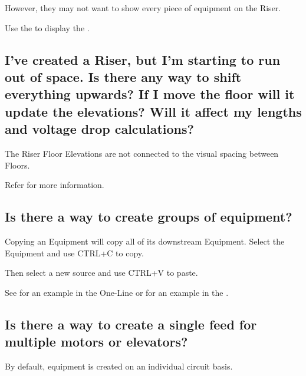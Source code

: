 \documentclass[letterpaper,10pt,english]{sphinxmanual}
\begin{document}
However, they may not want to show every piece of equipment on the Riser.

Use the {\hyperref[\detokenize{docs/userguide/buildingelectricalmodel/riser/index-riser:riser-toolbox}]{}} to display the {\hyperref[\detokenize{docs/userguide/buildingelectricalmodel/riser/index-riser:hidden-elements}]{}}.


\subsection{I’ve created a Riser, but I’m starting to run out of space.  Is there any way to shift everything upwards?  If I move the floor will it update the elevations?  Will it affect my lengths and voltage drop calculations?}
\label{\detokenize{docs/faq:i-ve-created-a-riser-but-i-m-starting-to-run-out-of-space-is-there-any-way-to-shift-everything-upwards-if-i-move-the-floor-will-it-update-the-elevations-will-it-affect-my-lengths-and-voltage-drop-calculations}}
The Riser Floor Elevations are not connected to the visual spacing between Floors.

Refer {\hyperref[\detokenize{docs/userguide/buildingelectricalmodel/riser/index-riser:riser-floor-elevations}]{}} for more information.


\subsection{Is there a way to create groups of equipment?}
\label{\detokenize{docs/faq:is-there-a-way-to-create-groups-of-equipment}}
Copying an Equipment will copy all of its downstream Equipment.  Select the Equipment and use CTRL+C to copy.

Then select a new source and use CTRL+V to paste.

See {\hyperref[\detokenize{docs/userguide/buildingelectricalmodel/one-line/index-one-line:one-line-copying-equipment}]{}} for an example in the One-Line or {\hyperref[\detokenize{docs/userguide/buildingelectricalmodel/schedules/index-schedules:schedules-copying-equipment}]{}} for an example in the {\hyperref[\detokenize{docs/userguide/buildingelectricalmodel/schedules/index-schedules:schedules}]{}}.


\subsection{Is there a way to create a single feed for multiple motors or elevators?}
\label{\detokenize{docs/faq:is-there-a-way-to-create-a-single-feed-for-multiple-motors-or-elevators}}
By default, equipment is created on an individual circuit basis.
\end{document}
